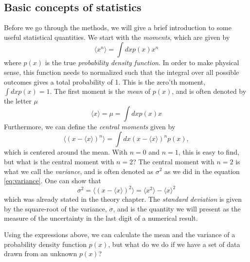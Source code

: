 \subsection{Basic concepts of statistics}
Before we go through the methods, we will give a brief introduction to some useful statistical quantities. We start with the \textit{moments}, which are given by
\begin{equation*}
\langle x^n\rangle=\int dxp(x)x^n
\end{equation*}
where $p(x)$ is the true \textit{probability density function}. In order to make physical sense, this function needs to normalized such that the integral over all possible outcomes gives a total probability of 1. This is the zero'th moment, $\int dxp(x)=1$. The first moment is the \textit{mean} of $p(x)$, and is often denoted by the letter $\mu$
\begin{equation}
\langle x\rangle=\mu=\int dxp(x)x
\end{equation}
Furthermore, we can define the \textit{central moments} given by
\begin{equation}
\langle(x-\langle x\rangle)^n\rangle=\int dx(x-\langle x\rangle)^np(x),
\end{equation}
which is centered around the mean. With $n=0$ and $n=1$, this is easy to find, but what is the central moment with $n=2$? The central moment with $n=2$ is what we call the \textit{variance}, and is often denoted as $\sigma^2$ as we did in the equation \eqref{eq:variance}. One can show that
\begin{equation}
\sigma^2=\langle(x-\langle x\rangle)^2\rangle=\langle x^2\rangle - \langle x \rangle^2
\label{eq:variance2}
\end{equation}
which was already stated in the theory chapter. The \textit{standard deviation} is given by the square-root of the variance, $\sigma$, and is the quantity we will present as the measure of the uncertainty in the last digit of a numerical result. 

Using the expressions above, we can calculate the mean and the variance of a probability density function $p(x)$, but what do we do if we have a set of data drawn from an unknown $p(x)$?

